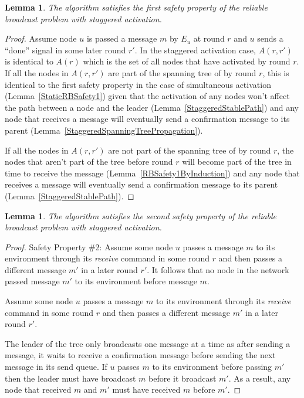 \documentclass[english]{article}
\newtheorem{lemma}[theorem]{Lemma}
\begin{document}
\begin{lemma}
\label{StaggeredRBSafety1}
  The algorithm satisfies the first safety property of the reliable broadcast problem with staggered activation.
\end{lemma}
\begin{proof}

Assume node $u$ is passed a message $m$ by $E_u$ at round $r$ and $u$ sends  a ``done'' signal in some later round $r'$.
In the staggered activation case, $A(r,r')$ is identical to $A(r)$ which is the set of all nodes that have activated by round $r$. If all the nodes in $A(r,r')$ are part of the spanning tree of by round $r$, this is identical to the first safety property in the case of simultaneous activation (Lemma~\ref{StaticRBSafety1}) given that the activation of any nodes won't affect the path between a node and the leader (Lemma~\ref{StaggeredStablePath}) and any node that receives a message will eventually send a confirmation message to its parent (Lemma~\ref{StaggeredSpanningTreePropagation}). 

If all the nodes in $A(r,r')$ are not part of the spanning tree of by round $r$, the nodes that aren't part of the tree before round $r$ will become part of the tree in time to receive the message (Lemma~\ref{RBSafety1ByInduction}) and any node that receives a message will eventually send a confirmation message to its parent (Lemma~\ref{StaggeredStablePath}).

\end{proof}


\begin{lemma}
\label{StaggeredRBSafety2}
The algorithm satisfies the second safety property of the reliable broadcast problem with staggered activation.
\end{lemma}
\begin{proof}
Safety Property \#2: Assume some node $u$ passes a message $m$ to its environment through its \textit{receive} command in some round $r$ and then passes a different message $m'$ in a later round $r'$. It follows that no node in the network passed message $m'$ to its environment before message $m$. 

Assume some node $u$ passes a message $m$ to its environment through its \textit{receive} command in some round $r$ and then passes a different message $m'$ in a later round $r'$. 

The leader of the tree only broadcasts one message at a time as after sending a message, it waits to receive a confirmation message before sending the next message in its send queue. If $u$ passes $m$ to its environment before passing $m'$ then the leader must have broadcast $m$ before it broadcast $m'$. As a result, any node that received $m$ and $m'$ must have received $m$ before $m'$.

\end{proof}
\end{document}
